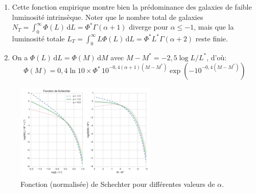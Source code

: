 \documentclass[a4paper,10pt]{report}
\renewcommand{\d}{\ensuremath{\mathrm{d}}}
\begin{document}
\begin{Answer}
  \begin{enumerate}
  \item Cette fonction empirique montre bien la prédominance des
    galaxies de faible luminosité intrinsèque. Noter que le nombre
    total de galaxies $N_{T} = \int_{0}^{\infty} \Phi(L)\,\d L =
    \Phi^{*}\Gamma(\alpha+1)$ diverge pour $\alpha \leq -1$, mais que
    la luminosité totale $L_{T} = \int_{0}^{\infty} L\Phi(L)\,\d L =
    \Phi^{*}L^{*}\Gamma(\alpha+2)$ reste finie.
  \item On a $\Phi(L)\,\d L = \Phi(M)\,\d M$ avec $M - M^{*} = -2,5\log
    L/L^{*}$, d'où:
    $$
    \Phi(M) = 0,4 \ln 10\times \Phi^{*}\,10^{-0,4(\alpha
      +1)(M-M^{*})}\exp \left( -10^{-0,4(M-M^{*})} \right)
    $$
  \end{enumerate}

  \begin{figure}%
    \centering
    \includegraphics[width=0.6\textwidth]{schechter}
    \caption{Fonction (normalisée) de Schechter pour différentes
      valeurs de $\alpha$.}
    \label{fig:schechter}
  \end{figure}
\end{Answer}

\end{document}
